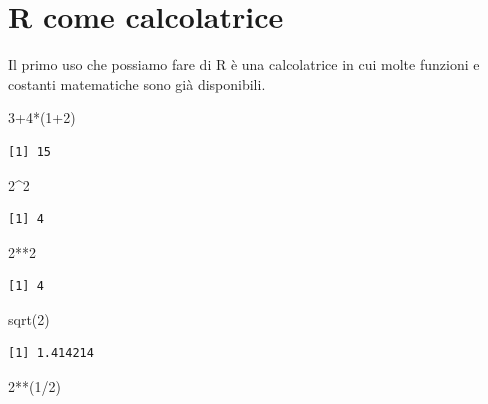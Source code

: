 \documentclass[
  italian,
  letterpaper,
]{book}
\newenvironment{Shaded}{\begin{snugshade}}{\end{snugshade}}
\newcommand{\DecValTok}[1]{\textcolor[rgb]{0.68,0.00,0.00}{#1}}
\newcommand{\FunctionTok}[1]{\textcolor[rgb]{0.28,0.35,0.67}{#1}}
\newcommand{\NormalTok}[1]{\textcolor[rgb]{0.00,0.23,0.31}{#1}}
\newcommand{\SpecialCharTok}[1]{\textcolor[rgb]{0.37,0.37,0.37}{#1}}
\theoremstyle{definition}
\theoremstyle{remark}
\begin{document}
\section{R come calcolatrice}\label{r-come-calcolatrice}

Il primo uso che possiamo fare di R è una calcolatrice in cui molte
funzioni e costanti matematiche sono già disponibili.

\begin{Shaded}
\begin{Highlighting}[]
\DecValTok{3}\SpecialCharTok{+}\DecValTok{4}\SpecialCharTok{*}\NormalTok{(}\DecValTok{1}\SpecialCharTok{+}\DecValTok{2}\NormalTok{)}
\end{Highlighting}
\end{Shaded}

\begin{verbatim}
[1] 15
\end{verbatim}

\begin{Shaded}
\begin{Highlighting}[]
\DecValTok{2}\SpecialCharTok{\^{}}\DecValTok{2}
\end{Highlighting}
\end{Shaded}

\begin{verbatim}
[1] 4
\end{verbatim}

\begin{Shaded}
\begin{Highlighting}[]
\DecValTok{2}\SpecialCharTok{**}\DecValTok{2}
\end{Highlighting}
\end{Shaded}

\begin{verbatim}
[1] 4
\end{verbatim}

\begin{Shaded}
\begin{Highlighting}[]
\FunctionTok{sqrt}\NormalTok{(}\DecValTok{2}\NormalTok{)}
\end{Highlighting}
\end{Shaded}

\begin{verbatim}
[1] 1.414214
\end{verbatim}

\begin{Shaded}
\begin{Highlighting}[]
\DecValTok{2}\SpecialCharTok{**}\NormalTok{(}\DecValTok{1}\SpecialCharTok{/}\DecValTok{2}\NormalTok{)}
\end{Highlighting}
\end{Shaded}
\end{document}
